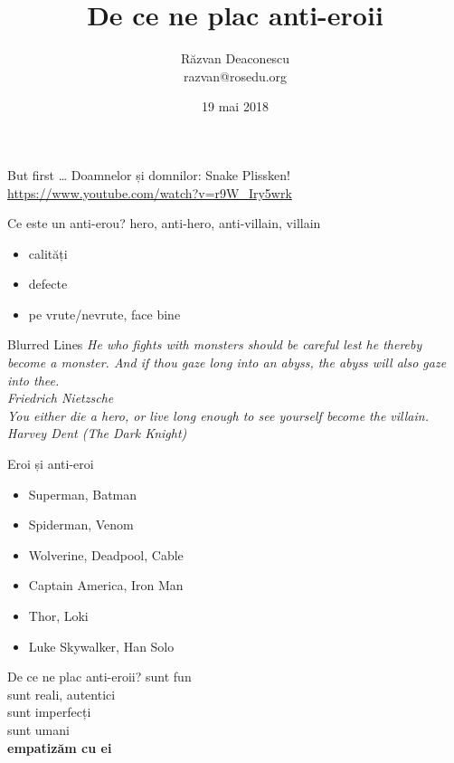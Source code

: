 \documentclass{beamer}
\title[Anti-eroi]{De ce ne plac anti-eroii}
\institute{ROSEdu}
\author[Răzvan Deaconescu]{Răzvan Deaconescu \\
razvan@rosedu.org}
\date{19 mai 2018}
\begin{document}
\frame{\titlepage}

\begin{frame}{But first \ldots}
  \centering
  \Large
  \pause Doamnelor și domnilor: Snake Plissken! \\
  \normalsize
  \url{https://www.youtube.com/watch?v=r9W_Iry5wrk}
\end{frame}

\begin{frame}{Ce este un anti-erou?}
  \pause hero, anti-hero, anti-villain, villain
  \begin{itemize}
    \pause \item calități
    \pause \item defecte
    \pause \item pe vrute/nevrute, face bine
  \end{itemize}
\end{frame}

\begin{frame}{Blurred Lines}
  \centering
  \pause \textit{He who fights with monsters should be careful lest he thereby become a monster. And if thou gaze long into an abyss, the abyss will also gaze into thee.} \\
  \vspace{3mm}
  \hfill \textit{Friedrich Nietzsche} \\
  \vspace{1cm}
  \pause \textit{You either die a hero, or live long enough to see yourself become the villain.} \\
  \vspace{3mm}
  \hfill \textit{Harvey Dent (The Dark Knight)}
\end{frame}

\begin{frame}{Eroi și anti-eroi}
  \begin{itemize}
    \pause \item Superman, Batman
    \pause \item Spiderman, Venom
    \pause \item Wolverine, Deadpool, Cable
    \pause \item Captain America, Iron Man
    \pause \item Thor, Loki
    \pause \item Luke Skywalker, Han Solo
  \end{itemize}
\end{frame}

\begin{frame}{De ce ne plac anti-eroii?}
  \centering
  \Large
  \pause sunt fun \\
  \pause sunt reali, autentici \\
  \pause sunt imperfecți \\
  \pause sunt umani \\
  \pause \textbf{empatizăm cu ei}
\end{frame}
\end{document}
